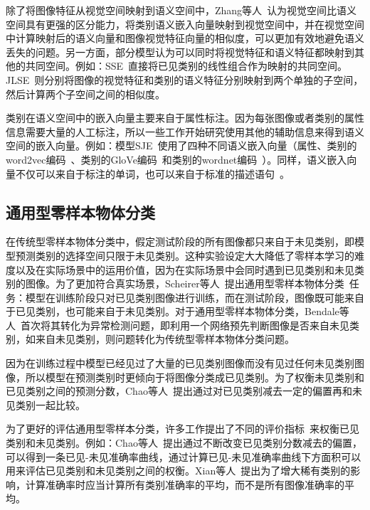 除了将图像特征从视觉空间映射到语义空间中，Zhang等人~\cite{zhang2017learning}认为视觉空间比语义空间具有更强的区分能力，将类别语义嵌入向量映射到视觉空间中，并在视觉空间中计算映射后的语义向量和图像视觉特征向量的相似度，可以更加有效地避免语义丢失的问题。另一方面，部分模型认为可以同时将视觉特征和语义特征都映射到其他的共同空间。例如：SSE~\cite{zhang2015zero}直接将已见类别的线性组合作为映射的共同空间。JLSE~\cite{zhang2016zero}则分别将图像的视觉特征和类别的语义特征分别映射到两个单独的子空间，然后计算两个子空间之间的相似度。

类别在语义空间中的嵌入向量主要来自于属性标注。因为每张图像或者类别的属性信息需要大量的人工标注，所以一些工作开始研究使用其他的辅助信息来得到语义空间的嵌入向量。例如：模型SJE~\cite{akata2015evaluation}使用了四种不同语义嵌入向量（属性、类别的word2vec编码~\cite{mikolov2013distributed}、类别的GloVe编码~\cite{pennington2014glove}和类别的wordnet编码~\cite{miller1995wordnet}）。同样，语义嵌入向量不仅可以来自于标注的单词，也可以来自于标准的描述语句~\cite{reed2016learning,lei2015predicting,elhoseiny2013write}。


\subsection{通用型零样本物体分类}
在传统型零样本物体分类中，假定测试阶段的所有图像都只来自于未见类别，即模型预测类别的选择空间只限于未见类别。这种实验设定大大降低了零样本学习的难度以及在实际场景中的运用价值，因为在实际场景中会同时遇到已见类别和未见类别的图像。为了更加符合真实场景，Scheirer等人~\cite{scheirer2012toward}提出通用型零样本物体分类~\cite{scheirer2012toward}任务：模型在训练阶段只对已见类别图像进行训练，而在测试阶段，图像既可能来自于已见类别，也可能来自于未见类别。对于通用型零样本物体分类，Bendale等人~\cite{bendale2016towards}首次将其转化为异常检测问题，即利用一个网络预先判断图像是否来自未见类别，如来自未见类别，则问题转化为传统型零样本物体分类问题。

因为在训练过程中模型已经见过了大量的已见类别图像而没有见过任何未见类别图像，所以模型在预测类别时更倾向于将图像分类成已见类别。为了权衡未见类别和已见类别之间的预测分数，Chao等人~\cite{chao2016empirical}提出通过对已见类别减去一定的偏置再和未见类别一起比较。

为了更好的评估通用型零样本分类，许多工作提出了不同的评价指标~\cite{chao2016empirical,xian2018zero}来权衡已见类别和未见类别。例如：Chao等人~\cite{chao2016empirical}提出通过不断改变已见类别分数减去的偏置，可以得到一条已见-未见准确率曲线，通过计算已见-未见准确率曲线下方面积可以用来评估已见类别和未见类别之间的权衡。Xian等人~\cite{xian2018zero}提出为了增大稀有类别的影响，计算准确率时应当计算所有类别准确率的平均，而不是所有图像准确率的平均。

